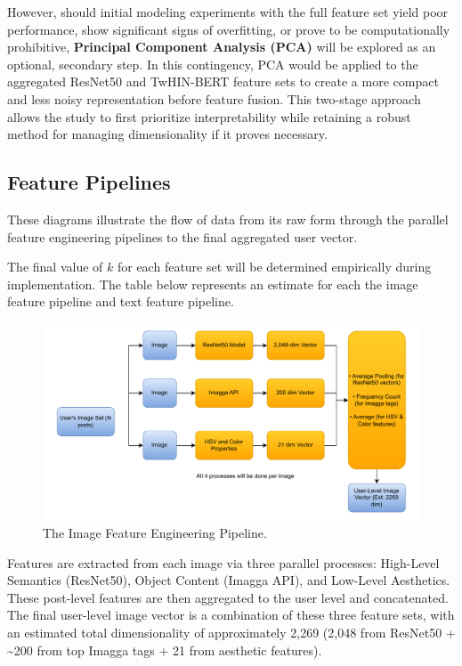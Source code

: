 However, should initial modeling experiments with the full feature set yield poor performance, show significant signs of overfitting, or prove to be computationally prohibitive, \textbf{Principal Component Analysis (PCA)} will be explored as an optional, secondary step. In this contingency, PCA would be applied to the aggregated ResNet50 and TwHIN-BERT feature sets to create a more compact and less noisy representation before feature fusion. This two-stage approach allows the study to first prioritize interpretability while retaining a robust method for managing dimensionality if it proves necessary.

\subsection{Feature Pipelines}
These diagrams illustrate the flow of data from its raw form through the parallel feature engineering pipelines to the final aggregated user vector. 

The final value of $k$ for each feature set will be determined empirically during implementation. The table below represents an estimate for each the image feature pipeline and text feature pipeline.


\begin{figure}[H]
	\centering
	\includegraphics[width=\textwidth]{"figures/Image-Pipeline-Diagram.pdf"}
	\caption{The Image Feature Engineering Pipeline. }
	\label{fig:image_pipeline_diagram}
\end{figure}

Features are extracted from each image via three parallel processes: High-Level Semantics (ResNet50), Object Content (Imagga API), and Low-Level Aesthetics. These post-level features are then aggregated to the user level and concatenated. The final user-level image vector is a combination of these three feature sets, with an estimated total dimensionality of approximately 2,269 (2,048 from ResNet50 + \textasciitilde200 from top Imagga tags + 21 from aesthetic features).

